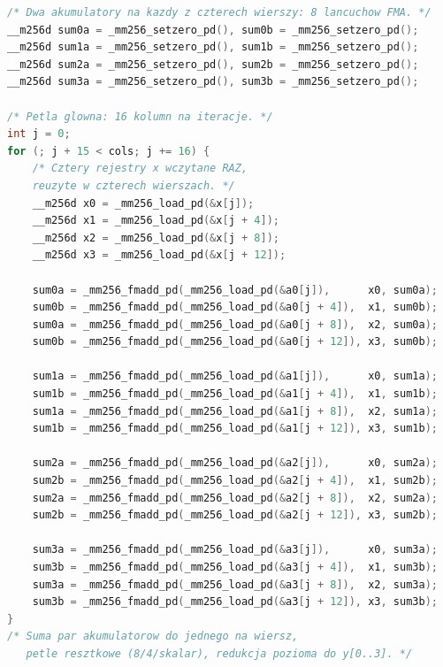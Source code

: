 \documentclass[a4paper,12pt]{book} %
\begin{document}
\begin{lstfloat}[t!]
\begin{lstlisting}[language=C, caption={Mnożenie macierzy przez wektor --- gorąca pętla jądra 4-wierszowego z podwójnymi akumulatorami (AVX2/FMA): wektor x wczytywany raz i reużyty w czterech wierszach, osiem niezależnych łańcuchów FMA po 16 kolumn na iterację}, label={lst:gemv-v3}]
/* Dwa akumulatory na kazdy z czterech wierszy: 8 lancuchow FMA. */
__m256d sum0a = _mm256_setzero_pd(), sum0b = _mm256_setzero_pd();
__m256d sum1a = _mm256_setzero_pd(), sum1b = _mm256_setzero_pd();
__m256d sum2a = _mm256_setzero_pd(), sum2b = _mm256_setzero_pd();
__m256d sum3a = _mm256_setzero_pd(), sum3b = _mm256_setzero_pd();

/* Petla glowna: 16 kolumn na iteracje. */
int j = 0;
for (; j + 15 < cols; j += 16) {
    /* Cztery rejestry x wczytane RAZ, 
    reuzyte w czterech wierszach. */
    __m256d x0 = _mm256_load_pd(&x[j]);
    __m256d x1 = _mm256_load_pd(&x[j + 4]);
    __m256d x2 = _mm256_load_pd(&x[j + 8]);
    __m256d x3 = _mm256_load_pd(&x[j + 12]);

    sum0a = _mm256_fmadd_pd(_mm256_load_pd(&a0[j]),      x0, sum0a);
    sum0b = _mm256_fmadd_pd(_mm256_load_pd(&a0[j + 4]),  x1, sum0b);
    sum0a = _mm256_fmadd_pd(_mm256_load_pd(&a0[j + 8]),  x2, sum0a);
    sum0b = _mm256_fmadd_pd(_mm256_load_pd(&a0[j + 12]), x3, sum0b);

    sum1a = _mm256_fmadd_pd(_mm256_load_pd(&a1[j]),      x0, sum1a);
    sum1b = _mm256_fmadd_pd(_mm256_load_pd(&a1[j + 4]),  x1, sum1b);
    sum1a = _mm256_fmadd_pd(_mm256_load_pd(&a1[j + 8]),  x2, sum1a);
    sum1b = _mm256_fmadd_pd(_mm256_load_pd(&a1[j + 12]), x3, sum1b);

    sum2a = _mm256_fmadd_pd(_mm256_load_pd(&a2[j]),      x0, sum2a);
    sum2b = _mm256_fmadd_pd(_mm256_load_pd(&a2[j + 4]),  x1, sum2b);
    sum2a = _mm256_fmadd_pd(_mm256_load_pd(&a2[j + 8]),  x2, sum2a);
    sum2b = _mm256_fmadd_pd(_mm256_load_pd(&a2[j + 12]), x3, sum2b);

    sum3a = _mm256_fmadd_pd(_mm256_load_pd(&a3[j]),      x0, sum3a);
    sum3b = _mm256_fmadd_pd(_mm256_load_pd(&a3[j + 4]),  x1, sum3b);
    sum3a = _mm256_fmadd_pd(_mm256_load_pd(&a3[j + 8]),  x2, sum3a);
    sum3b = _mm256_fmadd_pd(_mm256_load_pd(&a3[j + 12]), x3, sum3b);
}
/* Suma par akumulatorow do jednego na wiersz, 
   petle resztkowe (8/4/skalar), redukcja pozioma do y[0..3]. */
\end{lstlisting}
\end{lstfloat}
\end{document}
